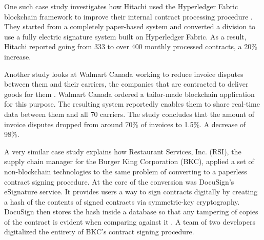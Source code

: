 One such case study investigates how Hitachi used the Hyperledger
Fabric blockchain framework to improve their internal contract
processing procedure \cite{hyperledgerHitachi}. They started from a
completely paper-based system and converted a division to use a fully
electric signature system built on Hyperledger Fabric. As a result,
Hitachi reported going from 333 to over 400 monthly processed
contracts, a 20\% increase.

Another study looks at Walmart Canada working to reduce invoice
disputes between them and their carriers, the companies that are
contracted to deliver goods for them \cite{hyperledgerWalmart}.
Walmart Canada ordered a tailor-made blockchain application for
this purpose. The resulting system reportedly enables them to share
real-time data between them and all 70 carriers. The study concludes
that the amount of invoice disputes dropped from around 70\% of
invoices to 1.5\%. A decrease of 98\%.
 
A very similar case study \cite{docusignBurger} explains how
Restaurant Services, Inc. (RSI), the supply chain manager for the
Burger King Corporation (BKC), applied a set of non-blockchain technologies
to the same problem of converting to a paperless contract signing
procedure. At the core of the conversion was DocuSign's eSignature
service. It provides users a way to sign contracts digitally by
creating a hash of the contents of signed contracts via symmetric-key
cryptography. DocuSign then stores the hash inside a database so that
any tampering of copies of the contract is evident when comparing
against it \cite{docusignHow}. A team of two developers digitalized
the entirety of BKC's contract signing procedure.
